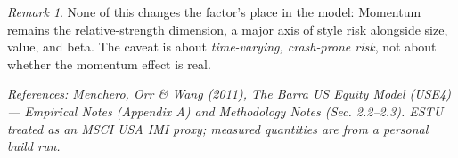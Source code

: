 \documentclass[11pt]{article}
\theoremstyle{definition}
\theoremstyle{plain}
\theoremstyle{remark}
\newtheorem*{remark}{Remark}
\begin{document}
\begin{remark}
None of this changes the factor's place in the model: Momentum remains the relative-strength dimension, a major axis of style risk alongside size, value, and beta. The caveat is about \emph{time-varying, crash-prone risk}, not about whether the momentum effect is real.
\end{remark}

\begin{center}\small\itshape
References: Menchero, Orr \& Wang (2011), \textit{The Barra US Equity Model (USE4)} --- Empirical Notes (Appendix A) and Methodology Notes (Sec. 2.2--2.3). ESTU treated as an MSCI USA IMI proxy; measured quantities are from a personal build run.
\end{center}
\end{document}
